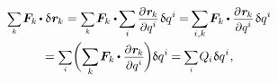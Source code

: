 \begin{otherlanguage}{russian}
\vspace{-0.33em}\noindent
{}

\nopagebreak\vspace{-0.25em}
\begin{multline}
\scalebox{.8}{$ \displaystyle \sum_{\smash{k}} $} \hspace{.2ex}
\bm{F}_k \hspace{-0.2ex} \dotp \variation{\hspace{.1ex}\locationvector_{\hspace{-0.1ex}k}}
=
\scalebox{.8}{$ \displaystyle \sum_{\smash{k}} $} \hspace{.2ex}
\bm{F}_k \dotp \hspace{-0.2ex} \scalebox{.95}[.98]{$ \displaystyle \sum_{\smash{i}} $} \hspace{.3ex}
\partialoflocationbycoordinatewithbothindices{\hspace{-0.1ex}k}{i} \hspace{.2ex} \variation{q^i}
\hspace{-0.1ex} = \hspace{-0.2ex}
\scalebox{.95}[.98]{$ \displaystyle \sum_{\smash{i,k}} $} \hspace{.2ex}
\bm{F}_k \hspace{-0.1ex} \dotp
\partialoflocationbycoordinatewithbothindices{\hspace{-0.1ex}k}{i} \hspace{.2ex} \variation{q^i}
\\
%
=
\scalebox{.8}{$ \displaystyle \sum_{\smash{i}} $}
\biggl( \scalebox{.95}[.98]{$ \displaystyle \sum_{\smash{k}} $} \hspace{.2ex}
\bm{F}_k \hspace{-0.1ex} \dotp
\partialoflocationbycoordinatewithbothindices{\hspace{-0.1ex}k}{i} \hspace{-0.2ex} \biggr) \hspace{-0.1ex} \variation{q^i}
\hspace{-0.1ex} = \hspace{-0.1ex}
\scalebox{.8}{$\displaystyle \sum_{i}$} \hspace{.16ex} Q_{\hspace{-0.1ex}i} \hspace{.12ex} \variation{q^i}
\hspace{.1ex} ,
\end{multline}


\end{otherlanguage}
